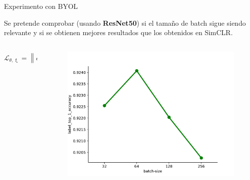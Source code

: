 \documentclass[aspectratio=169]{beamer}
\newcommand{\norm}[1]{\left\lVert#1\right\rVert}
\begin{document}
  \begin{frame}{Experimento con BYOL}

  Se pretende comprobar (usando \textbf{ResNet50}) si el tamaño de batch sigue siendo relevante y si se obtienen mejores resultados que los obtenidos en SimCLR.

\begin{columns}
  \begin{column}{0.4\textwidth}
    \[
      \mathcal L_{\theta,\upxi} = \norm{\overline{q_\theta}(z_\theta) - \overline{z_\upxi'}}_2^2 
      \]
  \end{column}
  \pause
  \begin{column}{0.6\textwidth}  %
    \begin{figure}[H]
      \centering 
      \includegraphics[scale=0.3]{byol-batch-comparison}
    \end{figure}
  \end{column}
\end{columns}


\begin{table}[H]
  \end{table}

  
  
  
  \end{frame}
  
\end{document}
